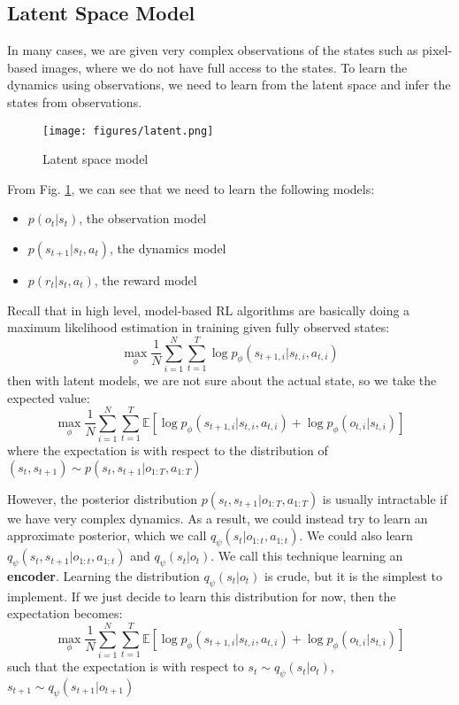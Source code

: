 \subsection{Latent Space Model}
In many cases, we are given very complex observations of the states such as pixel-based images, where we do not have full access to the states. To learn the dynamics using observations, we need to learn from the latent space and infer the states from observations. 
\begin{figure}
    \centering
    \texttt{[image: figures/latent.png]}
    \caption{Latent space model}
    \label{fig:latent}
\end{figure}
From Fig. \ref{fig:latent}, we can see that we need to learn the following models:
\begin{itemize}
    \item $p(o_t|s_t)$, the observation model
    \item $p(s_{t+1}|s_t,a_t)$, the dynamics model
    \item $p(r_t|s_t,a_t)$, the reward model
\end{itemize}

Recall that in high level, model-based RL algorithms are basically doing a maximum likelihood estimation in training given fully observed states:
\[
\max_\phi \frac{1}{N}\sum_{i=1}^N\sum_{t=1}^T\log p_\phi(s_{t+1,i}|s_{t,i},a_{t,i})
\]
then with latent models, we are not sure about the actual state, so we take the expected value:
\[
\max_\phi \frac{1}{N}\sum_{i=1}^N\sum_{t=1}^T\mathbb{E}\left[\log p_\phi(s_{t+1,i}|s_{t,i},a_{t,i}) + \log p_\phi(o_{t,i}|s_{t,i})\right]
\]
where the expectation is with respect to the distribution of $(s_t,s_{t+1})\sim p(s_t,s_{t+1}|o_{1:T},a_{1:T})$

However, the posterior distribution $p(s_t,s_{t+1}|o_{1:T},a_{1:T})$ is usually intractable if we have very complex dynamics. As a result, we could instead try to learn an approximate posterior, which we call $q_\psi(s_t|o_{1:t},a_{1;t})$. We could also learn $q_\psi(s_t,s_{t+1}|o_{1:t},a_{1;t})$ and $q_\psi(s_t|o_t)$. We call this technique learning an \textbf{encoder}. Learning the distribution $q_\psi(s_t|o_t)$ is crude, but it is the simplest to implement. If we just decide to learn this distribution for now, then the expectation becomes:
\[
\max_\phi \frac{1}{N}\sum_{i=1}^N\sum_{t=1}^T\mathbb{E}\left[\log p_\phi(s_{t+1,i}|s_{t,i},a_{t,i}) + \log p_\phi(o_{t,i}|s_{t,i})\right]
\]
such that the expectation is with respect to $s_t\sim q_\psi(s_t|o_t)$, $s_{t+1}\sim q_\psi(s_{t+1}|o_{t+1})$


